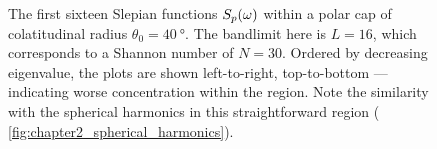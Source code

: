 \begin{figure}[htpb]
	\newline
	\hfill
	\hfill
	\hfill
	\caption[
		The Slepian functions within a \(\SI{40}{\degree}\) polar cap
	]{
		The first sixteen Slepian functions \({S}_{p}(\omega)\) within a polar cap of colatitudinal radius \(\theta_{0}=\SI{40}{\degree}\).
		The bandlimit here is  \(L=16\), which corresponds to a Shannon number of \(N=30\).
		Ordered by decreasing eigenvalue, the plots are shown left-to-right, top-to-bottom --- indicating worse concentration within the region.
		Note the similarity with the spherical harmonics in this straightforward region (\cf{} \cref{fig:chapter2_spherical_harmonics}).
	}\label{fig:chapter2_slepian_polar_cap}
\end{figure}
